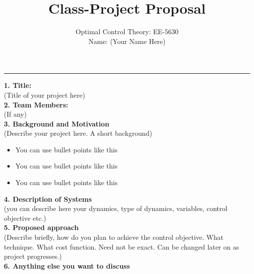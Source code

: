 \documentclass[12pt]{article}
\begin{document}
 
 
 
 

\title{Class-Project Proposal}

\author{Optimal Control Theory: EE-5630\\
Name: (Your Name Here)\\}

\maketitle

\hrule
\vspace{5mm}
\textbf{1. Title:}\\

(Title of your project here)\\

\textbf{2. Team Members:}\\

(If any)\\

\textbf{3. Background and Motivation}\\
(Describe your project here. A short background)
\begin{itemize}
\item You can use bullet points like this
\item You can use bullet points like this
\item You can use bullet points like this
\end{itemize}



\textbf{4. Description of Systems}\\
(you can describe here your dynamics, type of dynamics, variables, control objective etc.)\\


\textbf{5. Proposed approach}\\
(Describe briefly, how do you plan to achieve the control objective. What technique. What cost function. Need not be exact. Can be changed later on as project progresses.)\\

\textbf{6. Anything else you want to discuss}\\






 
\end{document}
